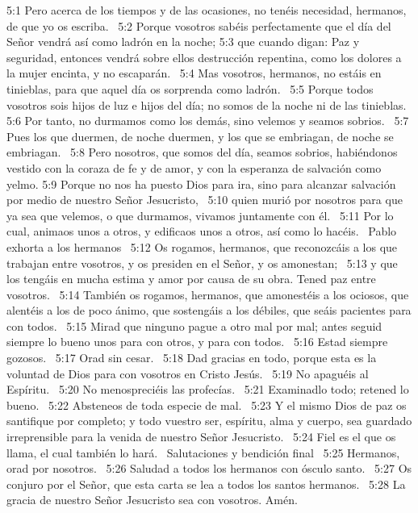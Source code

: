 5:1 Pero acerca de los tiempos y de las ocasiones, no tenéis necesidad, hermanos, de que yo os escriba.  
5:2 Porque vosotros sabéis perfectamente que el día del Señor vendrá así como ladrón en la noche; 
5:3 que cuando digan: Paz y seguridad, entonces vendrá sobre ellos destrucción repentina, como los dolores a la mujer encinta, y no escaparán.  
5:4 Mas vosotros, hermanos, no estáis en tinieblas, para que aquel día os sorprenda como ladrón.  
5:5 Porque todos vosotros sois hijos de luz e hijos del día; no somos de la noche ni de las tinieblas.  
5:6 Por tanto, no durmamos como los demás, sino velemos y seamos sobrios.  
5:7 Pues los que duermen, de noche duermen, y los que se embriagan, de noche se embriagan.  
5:8 Pero nosotros, que somos del día, seamos sobrios, habiéndonos vestido con la coraza de fe y de amor, y con la esperanza de salvación como yelmo. 
5:9 Porque no nos ha puesto Dios para ira, sino para alcanzar salvación por medio de nuestro Señor Jesucristo,  
5:10 quien murió por nosotros para que ya sea que velemos, o que durmamos, vivamos juntamente con él.  
5:11 Por lo cual, animaos unos a otros, y edificaos unos a otros, así como lo hacéis.  
Pablo exhorta a los hermanos  
5:12 Os rogamos, hermanos, que reconozcáis a los que trabajan entre vosotros, y os presiden en el Señor, y os amonestan;  
5:13 y que los tengáis en mucha estima y amor por causa de su obra. Tened paz entre vosotros.  
5:14 También os rogamos, hermanos, que amonestéis a los ociosos, que alentéis a los de poco ánimo, que sostengáis a los débiles, que seáis pacientes para con todos.  
5:15 Mirad que ninguno pague a otro mal por mal; antes seguid siempre lo bueno unos para con otros, y para con todos.  
5:16 Estad siempre gozosos.  
5:17 Orad sin cesar.  
5:18 Dad gracias en todo, porque esta es la voluntad de Dios para con vosotros en Cristo Jesús.  
5:19 No apaguéis al Espíritu.  
5:20 No menospreciéis las profecías.  
5:21 Examinadlo todo; retened lo bueno.  
5:22 Absteneos de toda especie de mal.  
5:23 Y el mismo Dios de paz os santifique por completo; y todo vuestro ser, espíritu, alma y cuerpo, sea guardado irreprensible para la venida de nuestro Señor Jesucristo.  
5:24 Fiel es el que os llama, el cual también lo hará.  
Salutaciones y bendición final  
5:25 Hermanos, orad por nosotros.  
5:26 Saludad a todos los hermanos con ósculo santo.  
5:27 Os conjuro por el Señor, que esta carta se lea a todos los santos hermanos.  
5:28 La gracia de nuestro Señor Jesucristo sea con vosotros. Amén.